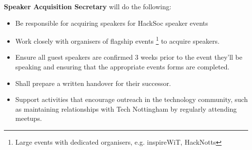 \begin{subclause}
	\textbf{Speaker Acquisition Secretary} will do the following:
	\begin{itemize}[label=--,topsep=0em,itemsep=0em]
		\item Be responsible for acquiring speakers for HackSoc speaker events
		\item Work closely with organisers of flagship events \footnote{Large events with dedicated organisers, e.g. inspireWiT, HackNotts} to acquire speakers.
		\item Ensure all guest speakers are confirmed 3 weeks prior to the event they'll be speaking and ensuring that the appropriate events forms are completed.
		\item Shall prepare a written handover for their successor.
		\item Support activities that encourage outreach in the technology community, such as maintaining relationships with Tech Nottingham by regularly attending meetups.
	\end{itemize}
\end{subclause}

